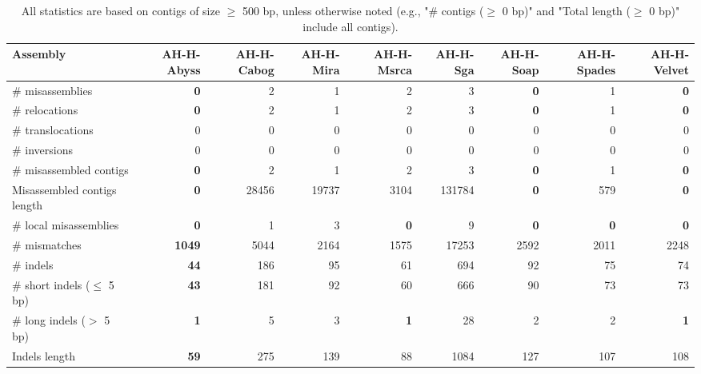\documentclass[12pt,a4paper]{article}
\begin{document}
\begin{table}[ht]
\begin{center}
\caption{All statistics are based on contigs of size $\geq$ 500 bp, unless otherwise noted (e.g., "\# contigs ($\geq$ 0 bp)" and "Total length ($\geq$ 0 bp)" include all contigs).}
\begin{tabular}{|l*{8}{|r}|}
\hline
Assembly & AH-H-Abyss & AH-H-Cabog & AH-H-Mira & AH-H-Msrca & AH-H-Sga & AH-H-Soap & AH-H-Spades & AH-H-Velvet \\ \hline
\# misassemblies & {\bf 0} & 2 & 1 & 2 & 3 & {\bf 0} & 1 & {\bf 0} \\ \hline
\hspace{5mm}\# relocations & {\bf 0} & 2 & 1 & 2 & 3 & {\bf 0} & 1 & {\bf 0} \\ \hline
\hspace{5mm}\# translocations & 0 & 0 & 0 & 0 & 0 & 0 & 0 & 0 \\ \hline
\hspace{5mm}\# inversions & 0 & 0 & 0 & 0 & 0 & 0 & 0 & 0 \\ \hline
\# misassembled contigs & {\bf 0} & 2 & 1 & 2 & 3 & {\bf 0} & 1 & {\bf 0} \\ \hline
Misassembled contigs length & {\bf 0} & 28456 & 19737 & 3104 & 131784 & {\bf 0} & 579 & {\bf 0} \\ \hline
\# local misassemblies & {\bf 0} & 1 & 3 & {\bf 0} & 9 & {\bf 0} & {\bf 0} & {\bf 0} \\ \hline
\# mismatches & {\bf 1049} & 5044 & 2164 & 1575 & 17253 & 2592 & 2011 & 2248 \\ \hline
\# indels & {\bf 44} & 186 & 95 & 61 & 694 & 92 & 75 & 74 \\ \hline
\hspace{5mm}\# short indels ($\leq$ 5 bp) & {\bf 43} & 181 & 92 & 60 & 666 & 90 & 73 & 73 \\ \hline
\hspace{5mm}\# long indels ($>$ 5 bp) & {\bf 1} & 5 & 3 & {\bf 1} & 28 & 2 & 2 & {\bf 1} \\ \hline
Indels length & {\bf 59} & 275 & 139 & 88 & 1084 & 127 & 107 & 108 \\ \hline
\end{tabular}
\end{center}
\end{table}
\end{document}
